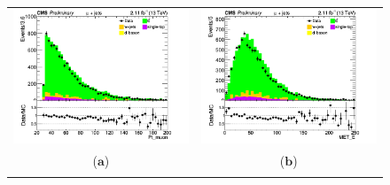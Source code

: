 \documentclass{cmspaper}
\begin{document}
\begin{figure}[htp]
\centering
\begin{tabular}{cc}
\hspace{-0.5cm}
\includegraphics[scale=0.40]{results/Pt_muon.png}
& \hspace{-0.5cm} \includegraphics[scale=0.40]{results/MET_E.png}\\
   ($\mathbf{a}$)\qquad\qquad&($\mathbf{b}$)\qquad\qquad\qquad\\
\hspace{-0.5cm}

\end{tabular}
\end{figure}
\end{document}
